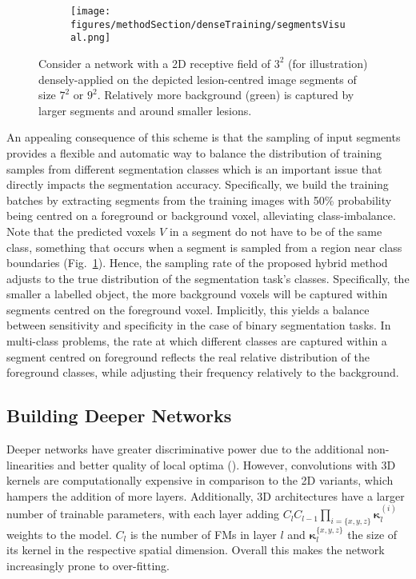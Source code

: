 \documentclass[preprint,authoryear,12pt]{elsarticle}
\begin{document}
\begin{figure}[!h]
\centering
\begin{subfigure}[b]{0.5\textwidth}
\centering
	\texttt{[image: figures/methodSection/denseTraining/segmentsVisual.png]}
\end{subfigure}

\caption{Consider a network with a 2D receptive field of $3^2$ (for illustration) densely-applied on the depicted lesion-centred image segments of size $7^2$ or $9^2$. Relatively more background (green) is captured by larger segments and around smaller lesions.}
\label{fig:segmentsVisual}
\end{figure} 
An appealing consequence of this scheme is that the sampling of input segments provides a flexible and automatic way to balance the distribution of training samples from different segmentation classes which is an important issue that directly impacts the segmentation accuracy. Specifically, we build the training batches by extracting segments from the training images with 50\% probability being centred on a foreground or background voxel, alleviating class-imbalance. Note that the predicted voxels $V$ in a segment do not have to be of the same class, something that occurs when a segment is sampled from a region near class boundaries (Fig.~\ref{fig:segmentsVisual}). Hence, the sampling rate of the proposed hybrid method adjusts to the true distribution of the segmentation task's classes. Specifically, the smaller a labelled object, the more background voxels will be captured within segments centred on the foreground voxel. Implicitly, this yields a balance between sensitivity and specificity in the case of binary segmentation tasks. In multi-class problems, the rate at which different classes are captured within a segment centred on foreground reflects the real relative distribution of the foreground classes, while adjusting their frequency relatively to the background.

\subsection{Building Deeper Networks}
\label{subsec:buildingADeeperNetwork}
Deeper networks have greater discriminative power due to the additional non-linearities and better quality of local optima (\cite{Choromanska2015}). However, convolutions with 3D kernels are computationally expensive in comparison to the 2D variants, which hampers the addition of more layers. Additionally, 3D architectures have a larger number of trainable parameters, with each layer adding $C_l C_{l-1} \prod_{i=\{x,y,z\}}{\boldsymbol{\kappa}_{l}^{(i)}}$ weights to the model. $C_l$ is the number of FMs in layer $l$ and $\boldsymbol{\kappa}_{l}^{\{x,y,z\}}$ the size of its kernel in the respective spatial dimension. Overall this makes the network increasingly prone to over-fitting.
\end{document}
